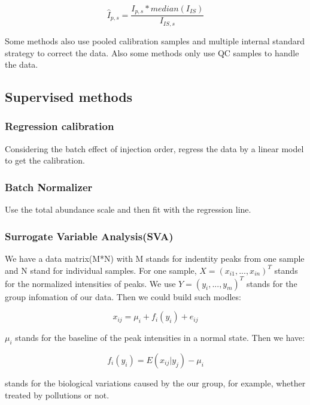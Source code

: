 \documentclass[
]{book}
\begin{document}
\[\hat I_{p,s} = \frac{I_{p,s} * median(I_{IS})}{I_{IS,s}}\]

Some methods also use pooled calibration samples and multiple internal standard strategy to correct the data\citep{van_der_kloet2009}. Also some methods only use QC samples to handle the data\citep{kuligowski2015}.

\hypertarget{supervised-methods}{%
\subsection{Supervised methods}\label{supervised-methods}}

\hypertarget{regression-calibration}{%
\subsubsection{Regression calibration}\label{regression-calibration}}

Considering the batch effect of injection order, regress the data by a linear model to get the calibration.

\hypertarget{batch-normalizer}{%
\subsubsection{Batch Normalizer}\label{batch-normalizer}}

Use the total abundance scale and then fit with the regression line\citep{wang2013}.

\hypertarget{surrogate-variable-analysissva}{%
\subsubsection{Surrogate Variable Analysis(SVA)}\label{surrogate-variable-analysissva}}

We have a data matrix(M*N) with M stands for indentity peaks from one sample and N stand for individual samples. For one sample, \(X = (x_{i1},...,x_{in})^T\) stands for the normalized intensities of peaks. We use \(Y = (y_i,...,y_m)^T\) stands for the group infomation of our data. Then we could build such modles:

\[x_{ij} = \mu_i + f_i(y_i) + e_{ij}\]

\(\mu_i\) stands for the baseline of the peak intensities in a normal state. Then we have:

\[f_i(y_i) = E(x_{ij}|y_j) - \mu_i\]

stands for the biological variations caused by the our group, for example, whether treated by pollutions or not.
\end{document}

